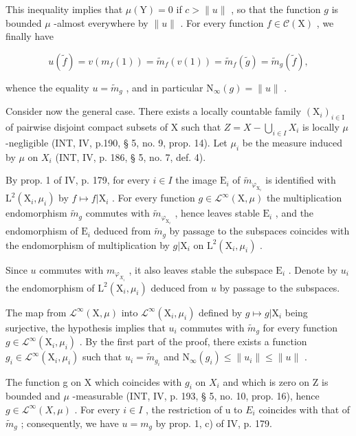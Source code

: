This inequality implies that \(\mu(\mathrm{Y}) = 0\) if \(c > \|u\|\) , so that the function \(g\) is bounded \(\mu\) -almost everywhere by \(\|u\|\) . For every function \(f \in \mathcal{C}(\mathrm{X})\) , we finally have

\[
u (\widetilde {f}) = v (m _ {f} (1)) = \widetilde {m} _ {f} (v (1)) = \widetilde {m} _ {f} (\widetilde {g}) = \widetilde {m} _ {g} (\widetilde {f}),
\]

whence the equality \(u = \tilde{m}_{g}\) , and in particular \(\mathrm{N}_{\infty}(g) = \| u\|\) .

Consider now the general case. There exists a locally countable family \((\mathrm{X}_{i})_{i\in\mathrm{I}}\) of pairwise disjoint compact subsets of X such that \(Z = X - \bigcup_{i \in I} X_i\) is locally \(\mu\) -negligible (INT, IV, p.190, § 5, no. 9, prop. 14). Let \(\mu_i\) be the measure induced by \(\mu\) on \(X_i\) (INT, IV, p. 186, § 5, no. 7, def. 4).

By prop. 1 of IV, p. 179, for every \(i \in I\) the image \(\mathrm{E}_i\) of \(\widetilde{m}_{\varphi_{\mathrm{X}_i}}\) is identified with \(\mathrm{L}^2(\mathrm{X}_i, \mu_i)\) by \(f \mapsto f|\mathrm{X}_i\) . For every function \(g \in \mathcal{L}^\infty(\mathrm{X}, \mu)\) the multiplication endomorphism \(\widetilde{m}_g\) commutes with \(\widetilde{m}_{\varphi_{\mathrm{X}_i}}\) , hence leaves stable \(\mathrm{E}_i\) , and the endomorphism of \(\mathrm{E}_i\) deduced from \(\widetilde{m}_g\) by passage to the subspaces coincides with the endomorphism of multiplication by \(g|\mathrm{X}_i\) on \(\mathrm{L}^2(\mathrm{X}_i, \mu_i)\) .

Since \(u\) commutes with \(m_{\varphi_{X_i}}\) , it also leaves stable the subspace \(\mathrm{E}_i\) . Denote by \(u_i\) the endomorphism of \(\mathrm{L}^2 (\mathrm{X}_i,\mu_i)\) deduced from \(u\) by passage to the subspaces.

The map from \(\mathcal{L}^{\infty}(\mathrm{X},\mu)\) into \(\mathcal{L}^{\infty}(\mathrm{X}_{i},\mu_{i})\) defined by \(g\mapsto g|\mathrm{X}_{i}\) being surjective, the hypothesis implies that \(u_{i}\) commutes with \(\widetilde{m}_{g}\) for every function \(g\in \mathcal{L}^{\infty}(\mathrm{X}_{i},\mu_{i})\) . By the first part of the proof, there exists a function \(g_{i}\in \mathcal{L}^{\infty}(\mathrm{X}_{i},\mu_{i})\) such that \(u_{i} = \widetilde{m}_{g_{i}}\) and \(\mathrm{N}_{\infty}(g_{i})\leqslant \| u_{i}\| \leqslant \| u\|\) .

The function g on X which coincides with \(g_{i}\) on \(X_{i}\) and which is zero on Z is bounded and \(\mu\) -measurable (INT, IV, p. 193, § 5, no. 10, prop. 16), hence \(g \in \mathcal{L}^{\infty}(X, \mu)\) . For every \(i \in I\) , the restriction of u to \(E_{i}\) coincides with that of \(\tilde{m}_{g}\) ; consequently, we have \(u = m_{g}\) by prop. 1, c) of IV, p. 179.

